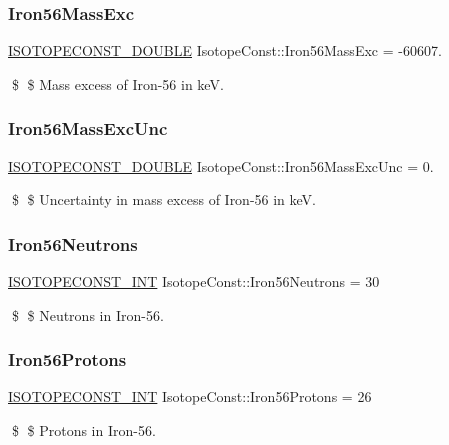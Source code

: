 \subsubsection{\texorpdfstring{Iron56\+Mass\+Exc}{Iron56MassExc}}
{\footnotesize\ttfamily \mbox{\hyperlink{group___isotope_const-_macros_ga8f45a7272ce02c0b4c65c44636ed719a}{I\+S\+O\+T\+O\+P\+E\+C\+O\+N\+S\+T\+\_\+\+D\+O\+U\+B\+LE}} Isotope\+Const\+::\+Iron56\+Mass\+Exc = -\/60607.}

\$ \$ Mass excess of Iron-\/56 in keV. \mbox{\label{group___isotope_const-_iron-_fe56_gae25114f5b7f62317c5a43e6d83c7cfc5}} 
\subsubsection{\texorpdfstring{Iron56\+Mass\+Exc\+Unc}{Iron56MassExcUnc}}
{\footnotesize\ttfamily \mbox{\hyperlink{group___isotope_const-_macros_ga8f45a7272ce02c0b4c65c44636ed719a}{I\+S\+O\+T\+O\+P\+E\+C\+O\+N\+S\+T\+\_\+\+D\+O\+U\+B\+LE}} Isotope\+Const\+::\+Iron56\+Mass\+Exc\+Unc = 0.}

\$ \$ Uncertainty in mass excess of Iron-\/56 in keV. \mbox{\label{group___isotope_const-_iron-_fe56_gabb37ea2029455598c31afac20697791c}} 
\subsubsection{\texorpdfstring{Iron56\+Neutrons}{Iron56Neutrons}}
{\footnotesize\ttfamily \mbox{\hyperlink{group___isotope_const-_macros_ga5f18360b3e99483a35c32d789e62621c}{I\+S\+O\+T\+O\+P\+E\+C\+O\+N\+S\+T\+\_\+\+I\+NT}} Isotope\+Const\+::\+Iron56\+Neutrons = 30}

\$ \$ Neutrons in Iron-\/56. \mbox{\label{group___isotope_const-_iron-_fe56_ga3a57df0b5eef0cfbcc63ac46b482f0da}} 
\subsubsection{\texorpdfstring{Iron56\+Protons}{Iron56Protons}}
{\footnotesize\ttfamily \mbox{\hyperlink{group___isotope_const-_macros_ga5f18360b3e99483a35c32d789e62621c}{I\+S\+O\+T\+O\+P\+E\+C\+O\+N\+S\+T\+\_\+\+I\+NT}} Isotope\+Const\+::\+Iron56\+Protons = 26}

\$ \$ Protons in Iron-\/56. 